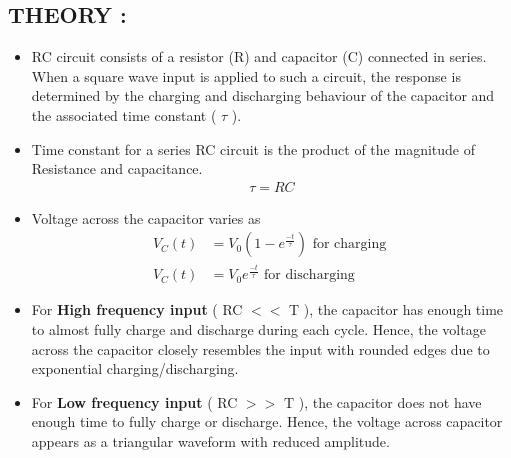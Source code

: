 \documentclass[12pt]{article}
\begin{document}
\subsection{\textbf{THEORY : }}
\begin{itemize}
\item RC circuit consists of a resistor (R) and capacitor (C) connected in series. When a square wave input is applied to such a circuit, the response is determined by the charging and discharging behaviour of the capacitor and the associated time constant ( $\tau$ ).
\item Time constant for a series RC circuit is the product of the magnitude of Resistance and capacitance.
\begin{align}
	\tau = R C
\end{align}
\item Voltage across the capacitor varies as
\begin{align}
	V_{C} (t) &= V_{0} \left( {1 - e^{\frac{-t}{\tau}}} \right) \text{ for charging } \\
	V_{C} (t) &= V_{0} e^{\frac{-t}{\tau}} \text{ for discharging }
\end{align}
\item For \textbf{High frequency input} ( RC $<<$ T ), the capacitor has enough time to almost fully charge and discharge during each cycle. Hence, the voltage across the capacitor closely resembles the input with rounded edges due to exponential charging/discharging.
\item For \textbf{Low frequency input} ( RC $>>$ T ), the capacitor does not have enough time to fully charge or discharge. Hence, the voltage across capacitor appears as a triangular waveform with reduced amplitude.
\end{itemize}
\end{document}
